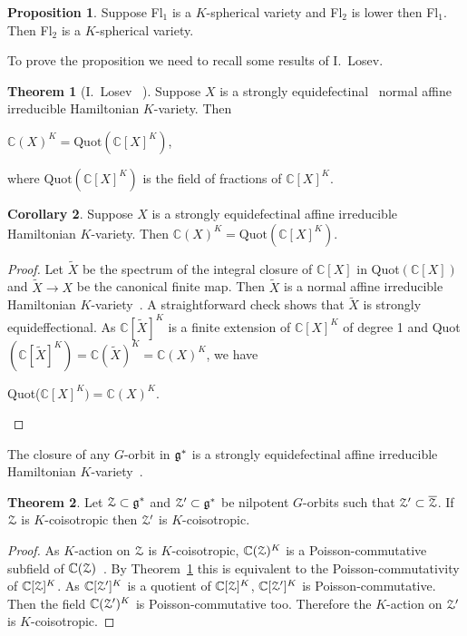 \documentclass[12pt]{amsart}
\theoremstyle{definition}\newtheorem{theorem}{Theorem}[section]
\newtheorem{proposition}{Proposition}[section]
\newtheorem{corollary}[proposition]{Corollary}
\theoremstyle{definition}\newtheorem{definition}[proposition]{Definition}
\theoremstyle{remark}\newtheorem{example}[proposition]{Example}
\renewcommand{\to}[1][]{\xrightarrow{#1}}
\begin{document}
\begin{proposition}\label{SphO} Suppose Fl$_1$ is a $K$-spherical variety and Fl$_2$ is lower then Fl$_1$. Then Fl$_2$ is a $K$-spherical variety.\end{proposition}
To prove the proposition we need to recall some results of I.~Losev.
\begin{theorem}[I.~Losev ~\cite{Lo}]\label{LI}Suppose $X$ is a strongly equidefectinal~\cite[Def. 1.2.5]{Lo} normal affine irreducible Hamiltonian $K$-variety. Then\begin{center} $\mathbb C(X)^K=\mathrm{Quot}(\mathbb C[X]^K)$,\end{center} where $\mathrm{Quot}(\mathbb C[X]^K)$ is the field of fractions of $\mathbb C[X]^K$.\end{theorem}
\begin{corollary}\label{Clp}Suppose $X$ is a strongly equidefectinal affine irreducible Hamiltonian $K$-variety. Then $\mathbb C(X)^K=\mathrm{Quot}(\mathbb C[X]^K)$.\end{corollary}
\begin{proof}Let $\tilde X$ be the spectrum of the integral closure of $\mathbb C[X]$ in Quot$(\mathbb C[X])$ and $\tilde X\to X$ be the canonical finite map. Then $\tilde X$ is a normal affine irreducible Hamiltonian $K$-variety~\cite{Kd}. A straightforward check shows that $\tilde X$ is strongly equideffectional. As $\mathbb C[\tilde X]^K$ is a finite extension of $\mathbb C[X]^K$ of degree 1 and Quot$(\mathbb C[\tilde X]^K)=\mathbb C(\tilde X)^K=\mathbb C(X)^K$, we have \begin{center}Quot($\mathbb C[X]^K)=\mathbb C(X)^K$.\end{center}\end{proof}
The closure of any $G$-orbit in $\frak g^*$ is a strongly equidefectinal affine irreducible Hamiltonian $K$-variety~\cite[Corollary 3.4.1]{Lo}.
\begin{theorem}\label{GrO} Let $\EuScript Z\subset\frak g^*$ and $\EuScript Z'\subset\frak g^*$ be nilpotent $G$-orbits such that $\EuScript Z'\subset\overline{\EuScript Z}$. If $\EuScript Z$ is $K$-coisotropic then $\EuScript Z'$ is $K$-coisotropic.\end{theorem}
\begin{proof} As $K$-action on $\EuScript Z$ is $K$-coisotropic, $\mathbb C(\EuScript Z)^K$ is a Poisson-commutative subfield of $\mathbb C(\EuScript Z)$~\cite[Ch. II, Prop. 5]{Vi}. By Theorem~\ref{LI} this is equivalent to the Poisson-commutativity of $\mathbb C[\EuScript Z]^K$. As $\mathbb C[\EuScript Z']^K$ is a quotient of $\mathbb C[\EuScript Z]^K$, $\mathbb C[\EuScript Z']^K$ is Poisson-commutative. Then the field $\mathbb C(\EuScript Z')^K$ is Poisson-commutative too. Therefore the $K$-action on $\EuScript Z'$ is $K$-coisotropic.\end{proof}
\end{document}
